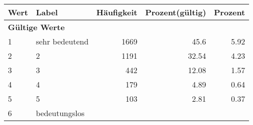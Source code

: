      \begin{longtable}{lXrrr}
     \toprule
     \textbf{Wert} & \textbf{Label} & \textbf{Häufigkeit} & \textbf{Prozent(gültig)} & \textbf{Prozent} \\
     \endhead
     \midrule
     \multicolumn{5}{l}{\textbf{Gültige Werte}}\\

     1 &
     \multicolumn{1}{X}{ sehr bedeutend   } &


       \num{1669} &
       \num[round-mode=places,round-precision=2]{45,6} &
         \num[round-mode=places,round-precision=2]{5,92} \\

     2 &
     \multicolumn{1}{X}{ 2   } &


       \num{1191} &
       \num[round-mode=places,round-precision=2]{32,54} &
         \num[round-mode=places,round-precision=2]{4,23} \\

     3 &
     \multicolumn{1}{X}{ 3   } &


       \num{442} &
       \num[round-mode=places,round-precision=2]{12,08} &
         \num[round-mode=places,round-precision=2]{1,57} \\

     4 &
     \multicolumn{1}{X}{ 4   } &


       \num{179} &
       \num[round-mode=places,round-precision=2]{4,89} &
         \num[round-mode=places,round-precision=2]{0,64} \\

     5 &
     \multicolumn{1}{X}{ 5   } &


       \num{103} &
       \num[round-mode=places,round-precision=2]{2,81} &
         \num[round-mode=places,round-precision=2]{0,37} \\

     6 &
     \multicolumn{1}{X}{ bedeutungslos   } &



\end{longtable}
